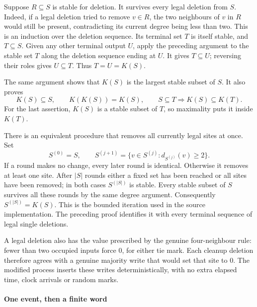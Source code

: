 \documentclass[
  11pt,
  a4paper,
]{article}
\begin{document}
Suppose \(R\subseteq S\) is stable for deletion. It survives every legal
deletion from \(S\). Indeed, if a legal deletion tried to remove
\(v\in R\), the two neighbours of \(v\) in \(R\) would still be present,
contradicting its current degree being less than two. This is an
induction over the deletion sequence. Its terminal set \(T\) is itself
stable, and \(T\subseteq S\). Given any other terminal output \(U\),
apply the preceding argument to the stable set \(T\) along the deletion
sequence ending at \(U\). It gives \(T\subseteq U\); reversing their
roles gives \(U\subseteq T\). Thus \(T=U=K(S)\).

The same argument shows that \(K(S)\) is the largest stable subset of
\(S\). It also proves \[
K(S)\subseteq S,\qquad K(K(S))=K(S),\qquad
S\subseteq T\Longrightarrow K(S)\subseteq K(T).
\tag{MM1}
\] For the last assertion, \(K(S)\) is a stable subset of \(T\), so
maximality puts it inside \(K(T)\).

There is an equivalent procedure that removes all currently legal sites
at once. Set \[
S^{(0)}=S,\qquad
S^{(j+1)}=\{v\in S^{(j)}:d_{S^{(j)}}(v)\geq2\}.
\] If a round makes no change, every later round is identical. Otherwise
it removes at least one site. After \(|S|\) rounds either a fixed set
has been reached or all sites have been removed; in both cases
\(S^{(|S|)}\) is stable. Every stable subset of \(S\) survives all these
rounds by the same degree argument. Consequently \(S^{(|S|)}=K(S)\).
This is the bounded iteration used in the source implementation. The
preceding proof identifies it with every terminal sequence of legal
single deletions.

A legal deletion also has the value prescribed by the genuine
four-neighbour rule: fewer than two occupied inputs force \(0\), for
either tie mark. Each cleanup deletion therefore agrees with a genuine
majority write that would set that site to \(0\). The modified process
inserts these writes deterministically, with no extra elapsed time,
clock arrivals or random marks.

\paragraph{One event, then a finite
word}\label{one-event-then-a-finite-word}
\end{document}

